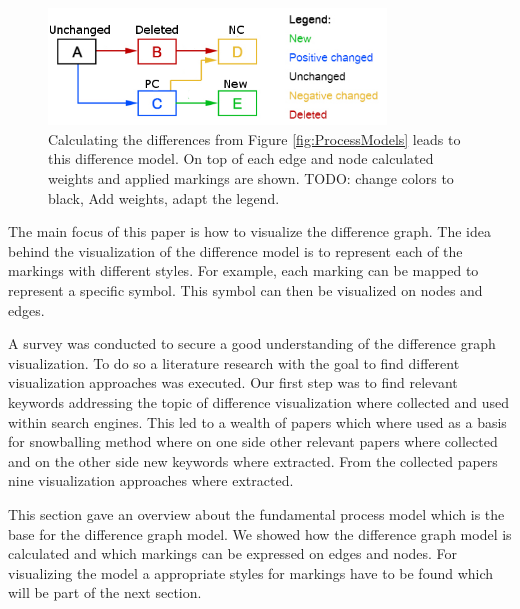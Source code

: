 \documentclass{llncs}
\begin{document}
\begin{figure}
	\centering
	\includegraphics[width=0.8\textwidth]{Images/ResultGraph.PNG}
	\caption{Calculating the differences from Figure \ref{fig:ProcessModels} leads to this difference model. On top of each edge and node calculated weights and applied markings are shown. TODO: change colors to black, Add weights, adapt the legend.
	}
	\label{fig:DiffGraphCalculation}
\end{figure}

The main  focus of this paper is how to visualize the difference graph. The idea behind the visualization of the difference model is to represent each of the markings with different styles. For example, each marking can be mapped to represent a specific symbol. This symbol can then be visualized on nodes and edges.

A survey was conducted to secure a good understanding of the difference graph visualization. To do so a literature research with the goal to find different visualization approaches was executed. Our first step was to find relevant keywords addressing the topic of difference visualization where collected and used within search engines. This led to a wealth of papers which where used as a basis for snowballing method where on one side other relevant papers where collected and on the other side new keywords where extracted. From the collected papers nine visualization approaches where extracted.

This section gave an overview about the fundamental process model which is the base for the difference graph model. We showed how the difference graph model is calculated and which markings can be expressed on edges and nodes. For visualizing the model a appropriate styles for markings have to be found which will be part of the next section.
\end{document}
